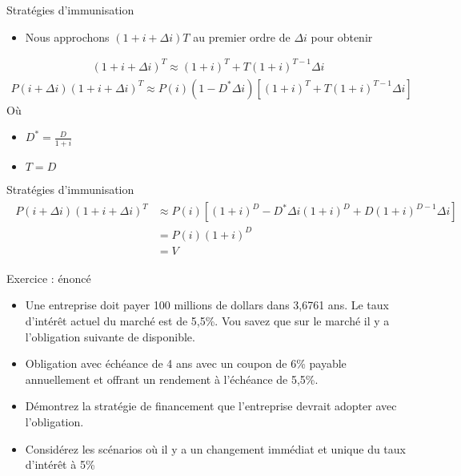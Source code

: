 \documentclass[10pt,a4paper]{beamer}
\begin{document}
\begin{frame}{Stratégies d'immunisation}
\begin{itemize}
\item Nous approchons $(1 + i + \Delta i) T$ au premier ordre de $\Delta i$ pour obtenir 
\end{itemize}
\begin{align*}
(1+i+\Delta i)^T \approx (1+i)^T+T(1+i)^{T-1} \Delta i
\end{align*}
\begin{align*}
P(i+\Delta i)(1+i+\Delta i)^T \approx P(i)(1-D^* \Delta i) \left[ (1+i)^T+T(1+i)^{T-1} \Delta i\right]
\end{align*}
Où 
\begin{itemize}[label=\bullet]
\item $D^*= \frac{D}{1+i}$
\item $T=D$
\end{itemize}
\end{frame}

\begin{frame}{Stratégies d'immunisation}
\begin{align*}
\begin{split}
P(i+\Delta i)(1+i+\Delta i)^T & \approx P(i) \left[(1+i)^D-D^* \Delta i (1+i)^D+D(1+i)^{D-1} \Delta i\right] \\  &  =  P(i)(1+i)^D \\ &  = V
\end{split}
\end{align*}

\end{frame}

\begin{frame}{Exercice : énoncé}
\begin{itemize}[label=\bullet]
\item Une entreprise doit payer 100 millions de dollars dans 3,6761 ans. Le taux d'intérêt actuel du marché est de 5,5\%.  Vou savez que sur le marché il  y a l'obligation suivante de disponible.
\item Obligation avec échéance de 4 ans avec un coupon de 6\% payable annuellement et offrant un rendement à l'échéance de 5,5\%.
\item Démontrez la stratégie de financement que l'entreprise devrait adopter avec l'obligation. 
\item Considérez les scénarios où il y a un changement immédiat et unique du taux d'intérêt à 5\% 
\end{itemize}
\end{frame}
\end{document}
